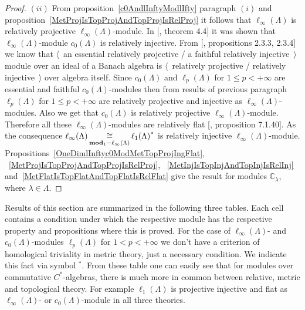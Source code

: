 \begin{proof}
$(ii)$ From proposition~\ref{c0AndlInftyModlIfty} paragraph $(i)$ and
proposition~\ref{MetProjIsTopProjAndTopProjIsRelProj} it follows that
$\ell_\infty(\Lambda)$ is relatively projective $\ell_\infty(\Lambda)$-module. 
In [\cite{NemANoteOnRelInjC0ModC0}, theorem 4.4] it was shown 
that $\ell_\infty(\Lambda)$-module $c_0(\Lambda)$ is relatively injective. 
From [\cite{RamsHomPropSemgroupAlg}, propositions 2.3.3, 2.3.4] we know that
$\langle$~an essential relatively projective / a  faithful relatively
injective~$\rangle$ module over an ideal of a Banach algebra is 
$\langle$~relatively projective / relatively injective~$\rangle$ over algebra 
itself. Since $c_0(\Lambda)$ and $\ell_p(\Lambda)$ for $1\leq p<+\infty$ are
essential and faithful $c_0(\Lambda)$-modules then from results of previous
paragraph $\ell_p(\Lambda)$ for $1\leq p<+\infty$ are relatively projective and
injective as $\ell_\infty(\Lambda)$-modules. Also we get that $c_0(\Lambda)$ is
relatively projective $\ell_\infty(\Lambda)$-module. Therefore all these
$\ell_\infty(\Lambda)$-modules are relatively flat [\cite{HelBanLocConvAlg},
proposition 7.1.40]. As the consequence $\ell_\infty(\Lambda)
\mathop{\mathbin{\cong}}\limits_{\mathbf{mod}_1-\ell_\infty(\Lambda)} {\ell_1(\Lambda)}^*$ is relatively
injective $\ell_\infty(\Lambda)$-module.
Propositions~\ref{OneDimlInftyc0ModMetTopProjIngFlat},
~\ref{MetProjIsTopProjAndTopProjIsRelProj},
~\ref{MetInjIsTopInjAndTopInjIsRelInj}
and~\ref{MetFlatIsTopFlatAndTopFlatIsRelFlat} give the result for modules
$\mathbb{C}_\lambda$, where $\lambda\in\Lambda$.
\end{proof}

Results of this section are summarized in the following three tables. Each cell
contains a condition under which the respective module has the respective
property and propositions where this is proved. For the case 
of $\ell_\infty(\Lambda)$- and $c_0(\Lambda)$-modules $\ell_p(\Lambda)$ 
for $1<p<+\infty$ we don't have a criterion of homological triviality in metric
theory, just a necessary condition. We indicate this fact via symbol ${}^*$.
From these table one can easily see that for modules over commutative
$C^*$-algebras, there is much more in common between relative, metric and
topological  theory. For example $\ell_1(\Lambda)$ is projective injective and
flat as $\ell_\infty(\Lambda)$- or $c_0(\Lambda)$-module in all three theories.


